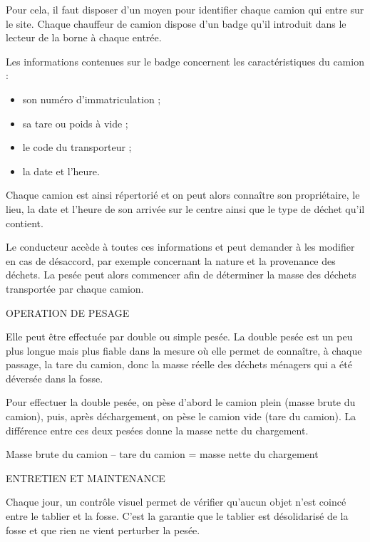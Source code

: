 Pour cela, il faut disposer d’un moyen pour identifier chaque camion qui entre sur le site. Chaque chauffeur de camion dispose d’un badge qu’il introduit dans le lecteur de la borne à chaque entrée.


Les informations contenues sur le badge concernent les caractéristiques du camion :
\begin{itemize}
\item son numéro d’immatriculation ;
\item sa tare ou poids à vide ;
\item le code du transporteur ;
\item la date et l’heure.
\end{itemize}


Chaque camion est ainsi répertorié et on peut alors connaître son propriétaire, le lieu, la date et l’heure de son arrivée sur le centre ainsi que le type de déchet qu’il contient.
\vspace{0.3cm}

Le conducteur accède à toutes ces informations et peut demander à les modifier en cas de désaccord, par exemple concernant la nature et la provenance des déchets.
La pesée peut alors commencer afin de déterminer la masse des déchets transportée par chaque camion.
\vspace{0.3cm}

OPERATION DE PESAGE
\vspace{0.3cm}

Elle peut être effectuée par double ou simple pesée.
La double pesée est un peu plus longue mais plus fiable dans la mesure où elle permet de connaître, à chaque passage, la tare du camion, donc la masse réelle des déchets ménagers qui a été déversée dans la fosse.
\vspace{0.3cm}

Pour effectuer la double pesée, on pèse d’abord le camion plein (masse brute du camion), puis, après déchargement, on pèse le camion vide (tare du camion). La différence entre ces deux pesées donne la masse nette du chargement.
\vspace{0.3cm}

Masse brute du camion – tare du camion = masse nette du chargement

\vspace{0.3cm}

ENTRETIEN ET MAINTENANCE
\vspace{0.3cm}

Chaque jour, un contrôle visuel permet de vérifier qu’aucun objet n’est coincé entre le tablier et la fosse. C’est la garantie que le tablier est désolidarisé de la fosse et que rien ne vient perturber la pesée.
\vspace{0.3cm}

